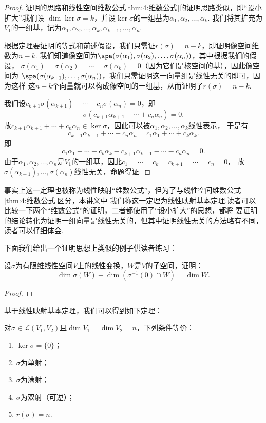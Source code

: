 \begin{proof}
    证明的思路和线性空间维数公式\autoref{thm:4:维数公式}的证明思路类似，即``设小扩大''.我们设
    $\dim\ker\sigma=k$，并设$\ker\sigma$的一组基为$\alpha_1,\alpha_2,\ldots,\alpha_k$.
    我们将其扩充为$V_1$的一组基，记为$\alpha_1,\alpha_2,\ldots,\alpha_k,\alpha_{k+1},\ldots,\alpha_n$.

    根据定理要证明的等式和前述假设，我们只需证$r(\sigma)=n-k$，即证明像空间维数为$n-k$.
    我们知道像空间为$\spa(\sigma(\alpha_1),\sigma(\alpha_2),\ldots,\sigma(\alpha_n))$，其中根据我们的假设，
    $\sigma(\alpha_1)=\sigma(\alpha_2)=\cdots=\sigma(\alpha_k)=0$（因为它们是核空间的基），因此像空间为
    $\spa(\sigma(\alpha_{k+1}),\ldots,\sigma(\alpha_n))$，我们只需证明这一向量组是线性无关的即可，因为这样
    这$n-k$个向量就可以构成像空间的一组基，从而证明了$r(\sigma)=n-k$.

    我们设$c_{k+1}\sigma(\alpha_{k+1})+\cdots+c_n\sigma(\alpha_n)=0$，即
    \[\sigma(c_{k+1}\alpha_{k+1}+\cdots+c_n\alpha_n)=0.\]
    故$c_{k+1}\alpha_{k+1}+\cdots+c_n\alpha_n \in \ker\sigma$，因此可以被$\alpha_1,\alpha_2,\ldots,\alpha_k$线性表示，
    于是有
    \[c_{k+1}\alpha_{k+1}+\cdots+c_n\alpha_n=c_1\alpha_1+\cdots+c_k\alpha_k.\]
    即
    \[c_1\alpha_1+\cdots+c_k\alpha_k-c_{k+1}\alpha_{k+1}-\cdots-c_n\alpha_n=0.\]
    由于$\alpha_1,\alpha_2,\ldots,\alpha_n$是$V_1$的一组基，因此$c_1=\cdots=c_k=c_{k+1}=\cdots=c_n=0$，
    故$\sigma(\alpha_{k+1}),\ldots,\sigma(\alpha_n)$线性无关，命题得证.
\end{proof}

事实上这一定理也被称为线性映射``维数公式''，但为了与线性空间维数公式\autoref{thm:4:维数公式}区分，本讲义中
我们称这一定理为线性映射基本定理.读者可以比较一下两个``维数公式''的证明，二者都使用了``设小扩大''的思想，都将
要证明的结论转化为证明一组向量是线性无关的，但其中证明线性无关的方法略有不同，读者可以仔细体会.

下面我们给出一个证明思想上类似的例子供读者练习：
\begin{example}
    设$\sigma$为有限维线性空间$V$上的线性变换，$W$是$V$的子空间，证明：
    \[\dim\sigma(W)+\dim(\sigma^{-1}(0) \cap W)=\dim W.\]
\end{example}
\begin{proof}
    
\end{proof}
基于线性映射基本定理，我们可以得到如下定理：
\begin{theorem}\label{thm:6:双射等价条件}
    对$\sigma \in \mathcal{L}(V_1,V_2)$且$\dim V_1=\dim V_2=n$，下列条件等价：
    \begin{enumerate}
        \item $\ker \sigma=\{0\}$；
        \item $\sigma$为单射；
        \item $\sigma$为满射；
        \item $\sigma$为双射（可逆）；
        \item $r(\sigma)=n$.
    \end{enumerate}
\end{theorem}

